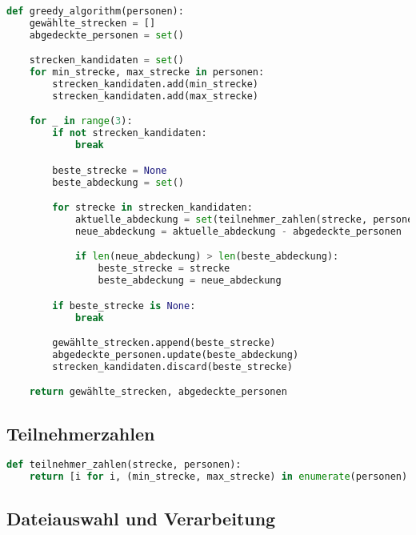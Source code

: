 \documentclass[a4paper,10pt,ngerman]{scrartcl}
\begin{document}
\begin{lstlisting}[language=Python]
def greedy_algorithm(personen):
    gewählte_strecken = []
    abgedeckte_personen = set()

    strecken_kandidaten = set()
    for min_strecke, max_strecke in personen:
        strecken_kandidaten.add(min_strecke)
        strecken_kandidaten.add(max_strecke)

    for _ in range(3):
        if not strecken_kandidaten:
            break

        beste_strecke = None
        beste_abdeckung = set()

        for strecke in strecken_kandidaten:
            aktuelle_abdeckung = set(teilnehmer_zahlen(strecke, personen))
            neue_abdeckung = aktuelle_abdeckung - abgedeckte_personen

            if len(neue_abdeckung) > len(beste_abdeckung):
                beste_strecke = strecke
                beste_abdeckung = neue_abdeckung

        if beste_strecke is None:
            break

        gewählte_strecken.append(beste_strecke)
        abgedeckte_personen.update(beste_abdeckung)
        strecken_kandidaten.discard(beste_strecke)

    return gewählte_strecken, abgedeckte_personen
\end{lstlisting}

\subsection{Teilnehmerzahlen}



\begin{lstlisting}[language=Python]
def teilnehmer_zahlen(strecke, personen):
    return [i for i, (min_strecke, max_strecke) in enumerate(personen) if min_strecke <= strecke <= max_strecke]
\end{lstlisting}

\subsection{Dateiauswahl und Verarbeitung}
\end{document}
